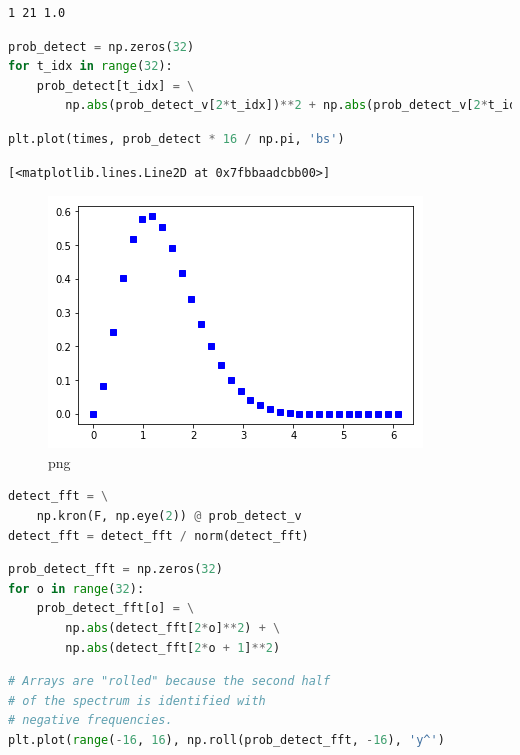 \begin{lstlisting}
1 21 1.0
\end{lstlisting}

\begin{lstlisting}[language=Python]
prob_detect = np.zeros(32)
for t_idx in range(32):
    prob_detect[t_idx] = \
        np.abs(prob_detect_v[2*t_idx])**2 + np.abs(prob_detect_v[2*t_idx+1])**2
\end{lstlisting}

\begin{lstlisting}[language=Python]
plt.plot(times, prob_detect * 16 / np.pi, 'bs')
\end{lstlisting}

\begin{lstlisting}
[<matplotlib.lines.Line2D at 0x7fbbaadcbb00>]
\end{lstlisting}

\begin{figure}
\centering
\includegraphics[width=0.66\linewidth]{output_92_1.png}
\caption{png}
\end{figure}

\begin{lstlisting}[language=Python]
detect_fft = \
    np.kron(F, np.eye(2)) @ prob_detect_v
detect_fft = detect_fft / norm(detect_fft)
\end{lstlisting}

\begin{lstlisting}[language=Python]
prob_detect_fft = np.zeros(32)
for o in range(32):
    prob_detect_fft[o] = \
        np.abs(detect_fft[2*o]**2) + \
        np.abs(detect_fft[2*o + 1]**2) 
\end{lstlisting}

\begin{lstlisting}[language=Python]
# Arrays are "rolled" because the second half 
# of the spectrum is identified with
# negative frequencies.
plt.plot(range(-16, 16), np.roll(prob_detect_fft, -16), 'y^')
\end{lstlisting}

